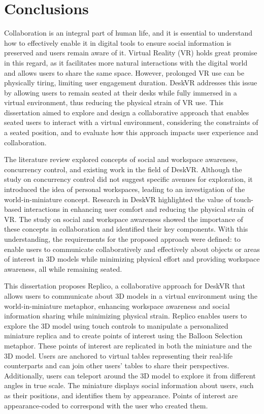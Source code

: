 \chapter{Conclusions} \label{chap:concl}

    Collaboration is an integral part of human life, and it is essential to understand how to effectively enable it in digital tools to ensure social information is preserved and users remain aware of it. Virtual Reality (VR) holds great promise in this regard, as it facilitates more natural interactions with the digital world and allows users to share the same space. However, prolonged VR use can be physically tiring, limiting user engagement duration. DeskVR addresses this issue by allowing users to remain seated at their desks while fully immersed in a virtual environment, thus reducing the physical strain of VR use. This dissertation aimed to explore and design a collaborative approach that enables seated users to interact with a virtual environment, considering the constraints of a seated position, and to evaluate how this approach impacts user experience and collaboration.

    The literature review explored concepts of social and workspace awareness, concurrency control, and existing work in the field of DeskVR. Although the study on concurrency control did not suggest specific avenues for exploration, it introduced the idea of personal workspaces, leading to an investigation of the world-in-miniature concept. Research in DeskVR highlighted the value of touch-based interactions in enhancing user comfort and reducing the physical strain of VR. The study on social and workspace awareness showed the importance of these concepts in collaboration and identified their key components. With this understanding, the requirements for the proposed approach were defined: to enable users to communicate collaboratively and effectively about objects or areas of interest in 3D models while minimizing physical effort and providing workspace awareness, all while remaining seated.

    This dissertation proposes Replico, a collaborative approach for DeskVR that allows users to communicate about 3D models in a virtual environment using the world-in-miniature metaphor, enhancing workspace awareness and social information sharing while minimizing physical strain. Replico enables users to explore the 3D model using touch controls to manipulate a personalized miniature replica and to create points of interest using the Balloon Selection metaphor. These points of interest are replicated in both the miniature and the 3D model. Users are anchored to virtual tables representing their real-life counterparts and can join other users' tables to share their perspectives. Additionally, users can teleport around the 3D model to explore it from different angles in true scale. The miniature displays social information about users, such as their positions, and identifies them by appearance. Points of interest are appearance-coded to correspond with the user who created them.

